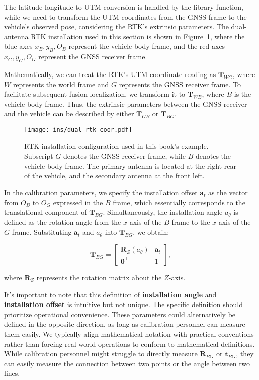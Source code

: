 The latitude-longitude to UTM conversion is handled by the library function, while we need to transform the UTM coordinates from the GNSS frame to the vehicle's observed pose, considering the RTK's extrinsic parameters. The dual-antenna RTK installation used in this section is shown in Figure~\ref{fig:dual-rtk-coor}, where the blue axes $x_B, y_B, O_B$ represent the vehicle body frame, and the red axes $x_G, y_G, O_G$ represent the GNSS receiver frame.

Mathematically, we can treat the RTK's UTM coordinate reading as $\bm{T}_{WG}$, where $W$ represents the world frame and $G$ represents the GNSS receiver frame. To facilitate subsequent fusion localization, we transform it to $\bm{T}_{WB}$, where $B$ is the vehicle body frame. Thus, the extrinsic parameters between the GNSS receiver and the vehicle can be described by either $\bm{T}_{GB}$ or $\bm{T}_{BG}$.

\begin{figure}
	\centering
	\texttt{[image: ins/dual-rtk-coor.pdf]}
	\caption{RTK installation configuration used in this book's example. Subscript $G$ denotes the GNSS receiver frame, while $B$ denotes the vehicle body frame. The primary antenna is located at the right rear of the vehicle, and the secondary antenna at the front left.}
	\label{fig:dual-rtk-coor}
\end{figure}

In the calibration parameters, we specify the installation offset $\bm{a}_t$ as the vector from $O_B$ to $O_G$ expressed in the $B$ frame, which essentially corresponds to the translational component of $\bm{T}_{BG}$. Simultaneously, the installation angle $a_{\theta}$ is defined as the rotation angle from the $x$-axis of the $B$ frame to the $x$-axis of the $G$ frame. Substituting $\bm{a}_t$ and $a_{\theta}$ into $\bm{T}_{BG}$, we obtain:

\begin{equation}\label{key}
	\bm{T}_{BG} = \begin{bmatrix}
		\bm{R}_Z (a_{\theta}) & \bm{a}_t \\
		\bm{0}^\top & 1
	\end{bmatrix},
\end{equation}

where $\bm{R}_Z$ represents the rotation matrix about the $Z$-axis.

It's important to note that this definition of \textbf{installation angle} and \textbf{installation offset} is intuitive but not unique. The specific definition should prioritize operational convenience. These parameters could alternatively be defined in the opposite direction, as long as calibration personnel can measure them easily. We typically align mathematical notation with practical conventions rather than forcing real-world operations to conform to mathematical definitions. While calibration personnel might struggle to directly measure $\bm{R}_{BG}$ or $\bm{t}_{BG}$, they can easily measure the connection between two points or the angle between two lines.

